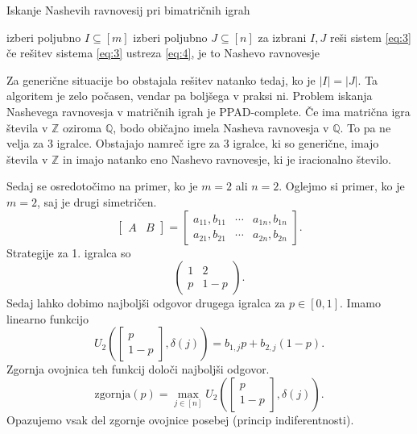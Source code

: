 \documentclass[10pt, a4paper]{article}
\newcommand{\Z}{\mathbb {Z}}
\newcommand{\Q}{\mathbb {Q}}
\begin{document}
\begin{algorithm}
  \caption{Iskanje Nashevih ravnovesij pri bimatričnih igrah}\label{alg:nash}
  \begin{algorithmic}[1]
    \State izberi poljubno $I \subseteq [m]$
    \State izberi poljubno $J \subseteq [n]$
    \State za izbrani $I, J$ reši sistem \eqref{eq:3}
    \State če rešitev sistema \eqref{eq:3} ustreza \eqref{eq:4}, je to Nashevo ravnovesje
  \end{algorithmic}
\end{algorithm}

Za generične situacije bo obstajala rešitev natanko tedaj, ko je $|I| = |J|$.
Ta algoritem je zelo počasen, vendar pa boljšega v praksi ni.
Problem iskanja Nashevega ravnovesja v matričnih igrah je PPAD-complete.
Če ima matrična igra števila v $\Z$ oziroma $\Q$, bodo običajno imela 
Nasheva ravnovesja v $\Q$. To pa ne velja za $3$ igralce.
Obstajajo namreč igre za $3$ igralce, ki so generične, 
imajo števila v $\Z$ in imajo natanko eno Nashevo ravnovesje, 
ki je iracionalno število.

Sedaj se osredotočimo na primer, ko je $m = 2$ ali $n = 2$.
Oglejmo si primer, ko je $m = 2$, saj je drugi simetričen.
$$\begin{bmatrix}
  A & B
\end{bmatrix}
= \begin{bmatrix}
  a_{11}, b_{11} & \cdots & a_{1n}, b_{1n}\\
  a_{21}, b_{21} & \cdots & a_{2n}, b_{2n}
\end{bmatrix}.
$$
Strategije za 1. igralca so 
$$\begin{pmatrix}
  1 & 2\\
  p & 1 - p
\end{pmatrix}.$$
Sedaj lahko dobimo najboljši odgovor drugega igralca za $p \in [0, 1]$.
Imamo linearno funkcijo $$U_2 \left(\begin{bmatrix}
  p \\ 1 - p
\end{bmatrix}, \delta(j)\right) = b_{1, j} p + b_{2, j} (1 - p).$$
Zgornja ovojnica teh funkcij določi najboljši odgovor.
$$\mathrm{zgornja}(p) = \max_{j \in [n]} U_2 \left(\begin{bmatrix}
  p\\ 1 - p
\end{bmatrix}, \delta(j)\right).$$ 
Opazujemo vsak del zgornje ovojnice posebej (princip indiferentnosti).
\end{document}
